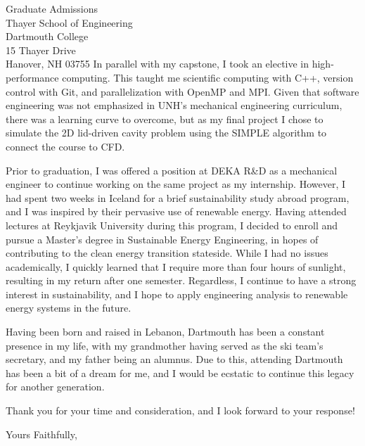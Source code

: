 \documentclass{letter}
\begin{document}
\begin{letter}{Graduate Admissions \\ Thayer School of Engineering \\ Dartmouth College \\ 15 Thayer Drive \\ Hanover, NH 03755}
    In parallel with my capstone, I took an elective in high-performance computing. This taught me scientific computing with C++, version 
    control with Git, and parallelization with OpenMP and MPI. Given that software engineering was not emphasized in UNH's 
    mechanical engineering curriculum, there was a learning curve to overcome, but as my final project I chose to simulate the 2D lid-driven 
    cavity problem using the SIMPLE algorithm to connect the course to CFD.

    Prior to graduation, I was offered a position at DEKA R\&D as a mechanical engineer to continue working on the same project as
    my internship. However, I had spent two weeks in Iceland for a brief sustainability study abroad program, and I was inspired by their
    pervasive use of renewable energy. Having attended lectures at Reykjavik University during this program, I decided to enroll  
    and pursue a Master's degree in Sustainable Energy Engineering, in hopes of contributing to the clean energy transition stateside. 
    While I had no issues academically, I quickly learned that I require more than four hours of sunlight, resulting in my return after 
    one semester. Regardless, I continue to have a strong interest in sustainability, and I hope to apply engineering analysis to renewable 
     energy systems in the future.

    Having been born and raised in Lebanon, Dartmouth has been a constant presence in my life, with my grandmother having served as 
    the ski team's secretary, and my father being an alumnus. Due to this, attending Dartmouth has been a bit 
    of a dream for me, and I would be ecstatic to continue this legacy for another generation.

    Thank you for your time and consideration, and I look forward to your response!

    \closing{Yours Faithfully,}

\end{letter}
\end{document}
